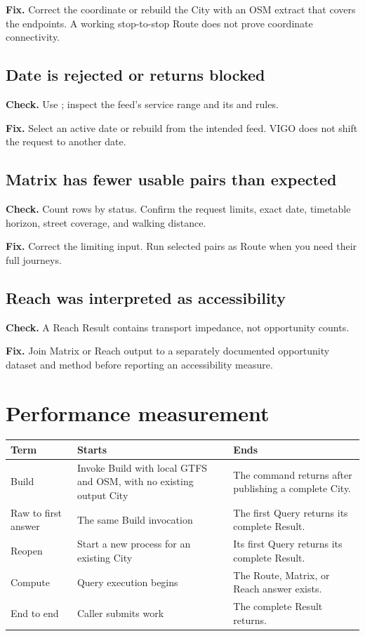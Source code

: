 \documentclass[10pt,letterpaper]{article}
\begin{document}
\textbf{Fix.} Correct the coordinate or rebuild the City with an OSM extract that covers the endpoints. A working stop-to-stop Route does not prove coordinate connectivity.

\subsection{Date is rejected or returns blocked}

\textbf{Check.} Use ; inspect the feed's service range and its  and  rules.

\textbf{Fix.} Select an active date or rebuild from the intended feed. VIGO does not shift the request to another date.

\subsection{Matrix has fewer usable pairs than expected}

\textbf{Check.} Count rows by status. Confirm the request limits, exact date, timetable horizon, street coverage, and walking distance.

\textbf{Fix.} Correct the limiting input. Run selected pairs as Route when you need their full journeys.

\subsection{Reach was interpreted as accessibility}

\textbf{Check.} A Reach Result contains transport impedance, not opportunity counts.

\textbf{Fix.} Join Matrix or Reach output to a separately documented opportunity dataset and method before reporting an accessibility measure.

\clearpage
\appendix

\section{Performance measurement}

\begin{center}
\begin{tabularx}{\linewidth}{P{1.05in} Y Y}
\toprule
\textbf{Term} & \textbf{Starts} & \textbf{Ends} \\
\midrule
Build & Invoke Build with local GTFS and OSM, with no existing output City & The command returns after publishing a complete City. \\
Raw to first answer & The same Build invocation & The first Query returns its complete Result. \\
Reopen & Start a new process for an existing City & Its first Query returns its complete Result. \\
Compute & Query execution begins & The Route, Matrix, or Reach answer exists. \\
End to end & Caller submits work & The complete Result returns. \\
\bottomrule
\end{tabularx}
\end{center}
\end{document}
